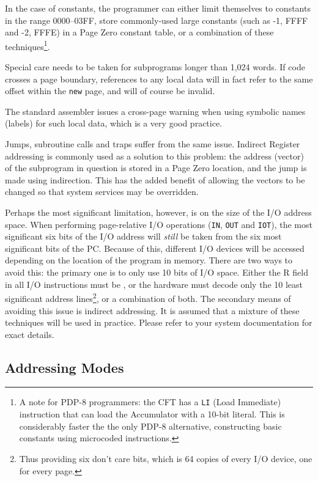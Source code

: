 \documentclass[11pt,a4paper,twocolumns]{article}
\newcommand\hex[1]{\textsf{#1}}
\newcommand\register[1]{\textsf{#1}}
\newcommand\PC{\register{PC}}
\begin{document}
In the case of constants, the programmer can either limit themselves
to constants in the range \hex{0000}–\hex{03FF}, store commonly-used
large constants (such as -1, \hex{FFFF} and -2, \hex{FFFE}) in a Page
Zero constant table, or a combination of these techniques\footnote{A
  note for PDP-8 programmers: the CFT has a {\tt LI} (Load Immediate)
  instruction that can load the Accumulator with a 10-bit
  literal. This is considerably faster the the only PDP-8 alternative,
  constructing basic constants using microcoded instructions.}.

Special care needs to be taken for subprograms longer than 1,024
words. If code crosses a page boundary, references to any local data
will in fact refer to the same offset within the {\tt new\/} page, and
will of course be invalid.

The standard assembler issues a cross-page warning when using symbolic
names (labels) for such local data, which is a very good practice.

Jumps, subroutine calls and traps suffer from the same issue. Indirect
Register addressing is commonly used as a solution to this problem:
the address (vector) of the subprogram in question is stored in a Page
Zero location, and the jump is made using indirection. This has the
added benefit of allowing the vectors to be changed so that system
services may be overridden.

Perhaps the most significant limitation, however, is on the size of
the I/O address space. When performing page-relative I/O operations
({\tt IN}, {\tt OUT} and {\tt IOT}), the most significant six bits of
the I/O address will {\em still\/} be taken from the six most
significant bits of the \PC. Because of this, different I/O devices
will be accessed depending on the location of the program in
memory. There are two ways to avoid this: the primary one is to only
use 10 bits of I/O space. Either the R field in all I/O instructions
must be {}, or the hardware must decode only the 10 least significant
address lines\footnote{Thus providing six don't care bits, which is 64
  copies of every I/O device, one for every page.}, or a combination
of both. The secondary means of avoiding this issue is indirect
addressing. It is assumed that a mixture of these techniques will be
used in practice. Please refer to your system documentation for exact
details.

\subsection{Addressing Modes}
\end{document}
